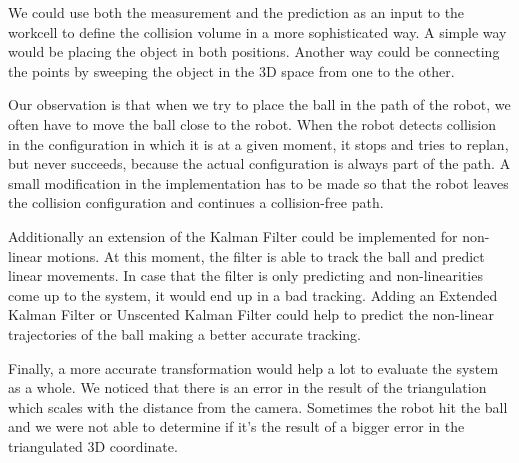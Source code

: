 We could use both the measurement and the prediction as an input to the workcell to define the collision volume in a more sophisticated way. A simple way would be placing the object in both positions. Another way could be connecting the points by sweeping the object in the 3D space from one to the other.

Our observation is that when we try to place the ball in the path of the robot, we often have to move the ball close to the robot. When the robot detects collision in the configuration in which it is at a given moment, it stops and tries to replan, but never succeeds, because the actual configuration is always part of the path. A small modification in the implementation has to be made so that the robot leaves the collision configuration and continues a collision-free path.

Additionally an extension of the Kalman Filter could be implemented for non-linear motions. At this moment, the filter is able to track the ball and predict linear movements. In case that the filter is only predicting and non-linearities come up to the system, it would end up in a bad tracking. Adding an Extended Kalman Filter or Unscented Kalman Filter could help to predict the non-linear trajectories of the ball making a better accurate tracking.

Finally, a more accurate transformation would help a lot to evaluate the system as a whole. We noticed that there is an error in the result of the triangulation which scales with the distance from the camera. Sometimes the robot hit the ball and we were not able to determine if it's the result of a bigger error in the triangulated 3D coordinate.

